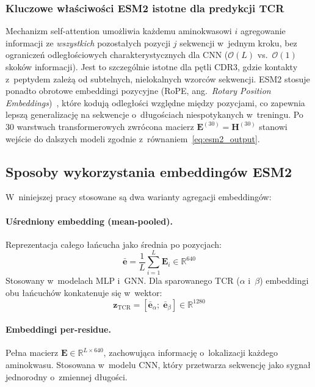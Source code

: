 \documentclass{SGGW-thesis}
\begin{document}
\subsubsection*{Kluczowe właściwości ESM2 istotne dla predykcji TCR}

Mechanizm self-attention umożliwia każdemu aminokwasowi $i$ agregowanie informacji ze
\textit{wszystkich} pozostałych pozycji $j$ sekwencji w~jednym kroku, bez ograniczeń
odległościowych charakterystycznych dla CNN ($\mathcal{O}(L)$ vs.\ $\mathcal{O}(1)$ skoków
informacji). Jest to szczególnie istotne dla pętli CDR3, gdzie kontakty z~peptydem zależą od
subtelnych, nielokalnych wzorców sekwencji. ESM2 stosuje ponadto obrotowe embeddingi pozycyjne
(RoPE, ang.\ \textit{Rotary Position Embeddings})~\cite{lin2023}, które kodują odległości względne między
pozycjami, co zapewnia lepszą generalizację na sekwencje o~długościach niespotykanych w~treningu.
Po 30 warstwach transformerowych zwrócona macierz $\mathbf{E}^{(30)} = \mathbf{H}^{(30)}$
stanowi wejście do dalszych modeli zgodnie z~równaniem~\eqref{eq:esm2_output}.

\subsection{Sposoby wykorzystania embeddingów ESM2}
\label{sec:esm2_usage}

W~niniejszej pracy stosowane są dwa warianty agregacji embeddingów:

\paragraph{Uśredniony embedding (mean-pooled).}
Reprezentacja całego łańcucha jako średnia po pozycjach:
\begin{equation}
    \bar{\mathbf{e}} = \frac{1}{L} \sum_{i=1}^{L} \mathbf{E}_i \in \mathbb{R}^{640}
    \label{eq:mean_pool}
\end{equation}
Stosowany w~modelach MLP i~GNN. Dla sparowanego TCR ($\alpha$ i~$\beta$) embeddingi obu łańcuchów
konkatenuje się w~wektor:
\begin{equation}
    \mathbf{z}_{\text{TCR}} = \left[\bar{\mathbf{e}}_\alpha;\; \bar{\mathbf{e}}_\beta\right] \in \mathbb{R}^{1280}
    \label{eq:tcr_concat}
\end{equation}

\paragraph{Embeddingi per-residue.}
Pełna macierz $\mathbf{E} \in \mathbb{R}^{L \times 640}$, zachowująca informację o~lokalizacji każdego
aminokwasu. Stosowana w~modelu CNN, który przetwarza sekwencję jako sygnał jednorodny o~zmiennej długości.
\end{document}
